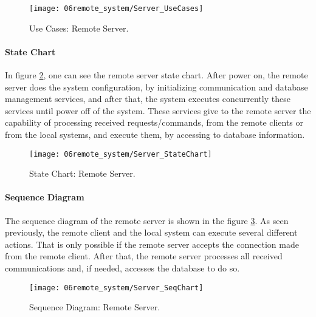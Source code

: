\begin{figure}[H]
	\centering
	\texttt{[image: 06remote\_system/Server\_UseCases]}
	\caption{Use Cases: Remote Server.}
	\label{fig:UseCases_Server}
\end{figure}

\paragraph*{State Chart}
In figure \ref{fig:StateChart_Server}, one can see the remote server state chart. After power on, the remote server does the system configuration, by initializing communication and database management services, and after that, the system executes concurrently these services until power off of the system. These services give to the remote server the capability of processing received requests/commands, from the remote clients or from the local systems, and execute them, by accessing to database information.

\begin{figure}[H]
	\centering
	\texttt{[image: 06remote\_system/Server\_StateChart]}
	\caption{State Chart: Remote Server.}
	\label{fig:StateChart_Server}
\end{figure}

\paragraph*{Sequence Diagram}
The sequence diagram of the remote server is shown in the figure \ref{fig:SeqDiagram_Server}. As seen previously, the remote client and the local system can execute several different actions. That is only possible if the remote server accepts the connection made from the remote client. After that, the remote server processes all received communications and, if needed, accesses the database to do so.

\begin{figure}[H]
	\centering
	\texttt{[image: 06remote\_system/Server\_SeqChart]}
	\caption{Sequence Diagram: Remote Server.}
	\label{fig:SeqDiagram_Server}
\end{figure}